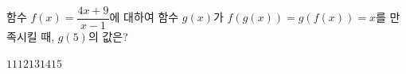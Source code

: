 \hspace*{2mm}\begin{minipage}[t]{\dimexpr\linewidth-2mm\relax}\vspace{0pt}
함수 $f(x)=\dfrac{4x+9}{x-1}$에 대하여 함수 $g(x)$가 $f(g(x))=g(f(x))=x$를 만족시킬 때, $g(5)$의 값은?
\begin{choices32}{$11$}{$12$}{$13$}{$14$}{$15$}\end{choices32}\end{minipage}
